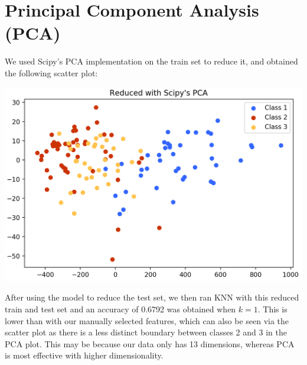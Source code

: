 \documentclass[11pt]{article}
\begin{document}
\section{Principal Component Analysis (PCA)}
We used Scipy's PCA implementation on the train set to reduce it, and obtained the following scatter plot:
\begin{center}
\includegraphics[scale=0.3]{pca_scatter_graph}
\end{center}

After using the model to reduce the test set, we then ran KNN with this reduced train and test set and an accuracy of 0.6792 was obtained when $k = 1$. This is lower than with our manually selected features, which can also be seen via the scatter plot as there is a less distinct boundary between classes 2 and 3 in the PCA plot. This may be because our data only has 13 dimensions, whereas PCA is most effective with higher dimensionality.
\end{document}
